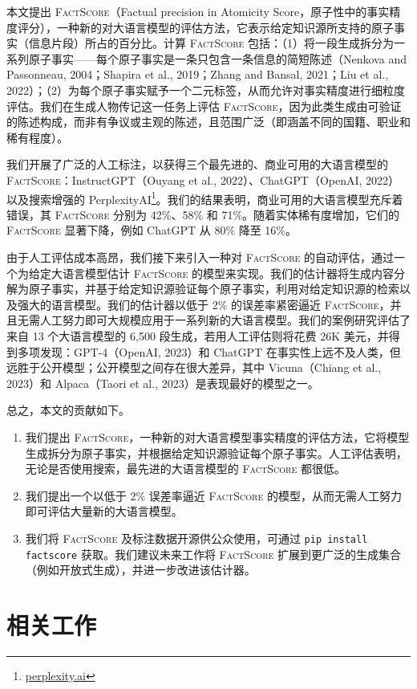 \documentclass[11pt,UTF8,fontset=fandol]{ctexart}
\newcommand{\FS}{\textsc{FactScore}}
\begin{document}
本文提出 \FS（Factual precision in Atomicity Score，原子性中的事实精度评分），一种新的对大语言模型的评估方法，它表示给定知识源所支持的原子事实（信息片段）所占的百分比。计算 \FS{} 包括：（1）将一段生成拆分为一系列原子事实——每个原子事实是一条只包含一条信息的简短陈述（Nenkova and Passonneau, 2004；Shapira et al., 2019；Zhang and Bansal, 2021；Liu et al., 2022）；（2）为每个原子事实赋予一个二元标签，从而允许对事实精度进行细粒度评估。我们在生成人物传记这一任务上评估 \FS，因为此类生成由可验证的陈述构成，而非有争议或主观的陈述，且范围广泛（即涵盖不同的国籍、职业和稀有程度）。

我们开展了广泛的人工标注，以获得三个最先进的、商业可用的大语言模型的 \FS：InstructGPT（Ouyang et al., 2022）、ChatGPT（OpenAI, 2022）以及搜索增强的 PerplexityAI\footnote{\url{perplexity.ai}}。我们的结果表明，商业可用的大语言模型充斥着错误，其 \FS{} 分别为 42\%、58\% 和 71\%。随着实体稀有度增加，它们的 \FS{} 显著下降，例如 ChatGPT 从 80\% 降至 16\%。

由于人工评估成本高昂，我们接下来引入一种对 \FS{} 的自动评估，通过一个为给定大语言模型估计 \FS{} 的模型来实现。我们的估计器将生成内容分解为原子事实，并基于给定知识源验证每个原子事实，利用对给定知识源的检索以及强大的语言模型。我们的估计器以低于 2\% 的误差率紧密逼近 \FS，并且无需人工努力即可大规模应用于一系列新的大语言模型。我们的案例研究评估了来自 13 个大语言模型的 6{,}500 段生成，若用人工评估则将花费 26K 美元，并得到多项发现：GPT-4（OpenAI, 2023）和 ChatGPT 在事实性上远不及人类，但远胜于公开模型；公开模型之间存在很大差异，其中 Vicuna（Chiang et al., 2023）和 Alpaca（Taori et al., 2023）是表现最好的模型之一。

总之，本文的贡献如下。

\begin{enumerate}[leftmargin=2em]
\item 我们提出 \FS，一种新的对大语言模型事实精度的评估方法，它将模型生成拆分为原子事实，并根据给定知识源验证每个原子事实。人工评估表明，无论是否使用搜索，最先进的大语言模型的 \FS{} 都很低。
\item 我们提出一个以低于 2\% 误差率逼近 \FS{} 的模型，从而无需人工努力即可评估大量新的大语言模型。
\item 我们将 \FS{} 及标注数据开源供公众使用，可通过 \texttt{pip install factscore} 获取。我们建议未来工作将 \FS{} 扩展到更广泛的生成集合（例如开放式生成），并进一步改进该估计器。
\end{enumerate}

\section{相关工作}
\end{document}
